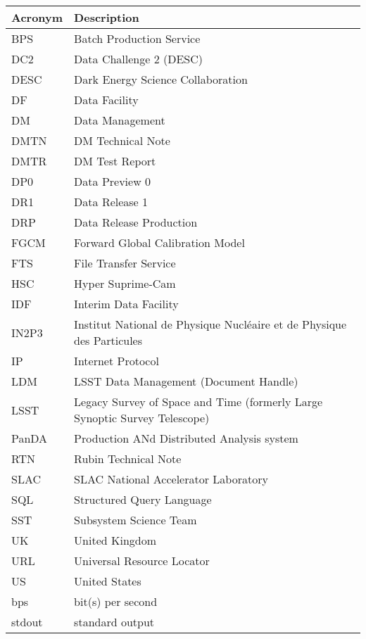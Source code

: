 \addtocounter{table}{-1}
\begin{longtable}{p{}p{}}\hline
\textbf{Acronym} & \textbf{Description}  \\\hline

BPS & Batch Production Service \\\hline
DC2 & Data Challenge 2 (DESC) \\\hline
DESC & Dark Energy Science Collaboration \\\hline
DF & Data Facility \\\hline
DM & Data Management \\\hline
DMTN & DM Technical Note \\\hline
DMTR & DM Test Report \\\hline
DP0 & Data Preview 0 \\\hline
DR1 & Data Release 1 \\\hline
DRP & Data Release Production \\\hline
FGCM & Forward Global Calibration Model \\\hline
FTS & File Transfer Service \\\hline
HSC & Hyper Suprime-Cam \\\hline
IDF & Interim Data Facility \\\hline
IN2P3 & Institut National de Physique Nucléaire et de Physique des Particules \\\hline
IP & Internet Protocol \\\hline
LDM & LSST Data Management (Document Handle) \\\hline
LSST & Legacy Survey of Space and Time (formerly Large Synoptic Survey Telescope) \\\hline
PanDA &  Production ANd Distributed Analysis system \\\hline
RTN & Rubin Technical Note \\\hline
SLAC & SLAC National Accelerator Laboratory \\\hline
SQL & Structured Query Language \\\hline
SST & Subsystem Science Team \\\hline
UK & United Kingdom \\\hline
URL & Universal Resource Locator \\\hline
US & United States \\\hline
bps & bit(s) per second \\\hline
stdout & standard output \\\hline
\end{longtable}
